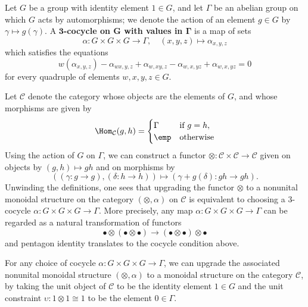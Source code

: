 \begin{example}
Let $G$ be a group with identity element $1\in G$, and let $\Gamma$ be an abelian group on which $G$ acts by automorphisms; we denote the action of an element $g\in G$ by $\gamma\mapsto g(\gamma)$. A \textbf{$\bm{3}$-cocycle on $\bm{G}$ with values in $\bm{\Gamma}$} is a map of sets
\[\alpha:G\times G\times G\to\Gamma,\quad (x,y,z)\mapsto\alpha_{x,y,z}\]
which satisfies the equations
\[w(\alpha_{x,y,z})-\alpha_{wx,y,z}+\alpha_{w,xy,z}-\alpha_{w,x,yz}+\alpha_{w,x,yz}=0\]
for every quadruple of elements $w,x,y,z\in G$.\par
Let $\mathcal{C}$ denote the category whose objects are the elements of $G$, and whose morphisms are given by
\[\Hom_{\mathcal{C}}(g,h)=\begin{cases}
\Gamma&\text{if $g=h$},\\
\emp&\text{otherwise}
\end{cases}\]
Using the action of $G$ on $\Gamma$, we can construct a functor $\otimes:\mathcal{C}\times\mathcal{C}\to\mathcal{C}$ given on objects by $(g,h)\mapsto gh$ and on morphisms by
\[((\gamma:g\to g),(\delta:h\to h))\mapsto(\gamma+g(\delta):gh\to gh).\]
Unwinding the definitions, one sees that upgrading the functor $\otimes$ to a nonunital monoidal structure on the category $(\otimes,\alpha)$ on $\mathcal{C}$ is equivalent to choosing a $3$-cocycle $\alpha:G\times G\times G\to\Gamma$. More precisely, any map $\alpha:G\times G\times G\to\Gamma$ can be regarded as a natural transformation of functors
\[\bullet\otimes(\bullet\otimes\bullet)\to(\bullet\otimes\bullet)\otimes\bullet\]
and pentagon identity translates to the cocycle condition above.\par
For any choice of cocycle $\alpha:G\times G\times G\to\Gamma$, we can upgrade the associated nonunital monoidal structure $(\otimes,\alpha)$ to a monoidal structure on the category $\mathcal{C}$, by taking the unit object of $\mathcal{C}$ to be the identity element $1\in G$ and the unit constraint $\upsilon:1\otimes 1\cong 1$ to be the element $0\in\Gamma$.
\end{example}
